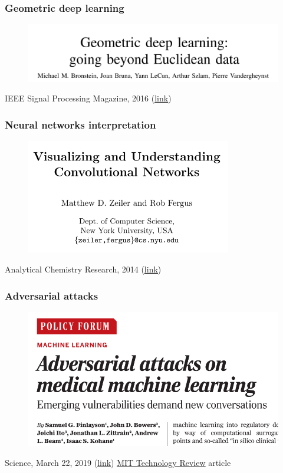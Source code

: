 \documentclass{beamer}
\begin{document}
\begin{frame}
\frametitle{Geometric deep learning}
\begin{figure}
	\centering
	\includegraphics[width=\textwidth]{images/geometric_deep_learning.png}
\end{figure}
IEEE Signal Processing Magazine, 2016 (\href{https://arxiv.org/abs/1611.08097}{{\color{blue}\underline{link}}})
\end{frame}


\begin{frame}
\frametitle{Neural networks interpretation}
\begin{figure}
	\centering
	\includegraphics[width=0.8\textwidth]{images/interpretation_nn.png}
\end{figure}
Analytical Chemistry Research, 2014 (\href{https://cs.nyu.edu/~fergus/papers/zeilerECCV2014.pdf}{{\color{blue}\underline{link}}})
\end{frame}


\begin{frame}
\frametitle{Adversarial attacks}
\begin{figure}
	\centering
	\includegraphics[width=\textwidth]{images/adversarial.png}
\end{figure}
Science, March 22, 2019
(\href{https://science.sciencemag.org/content/363/6433/1287}{{\color{blue}\underline{link}}})
\vfill
\href{https://www.technologyreview.com/s/613555/how-we-might-protect-ourselves-from-malicious-ai/}{{\color{blue}\underline{MIT Technology Review}}} article
\end{frame}
\end{document}
